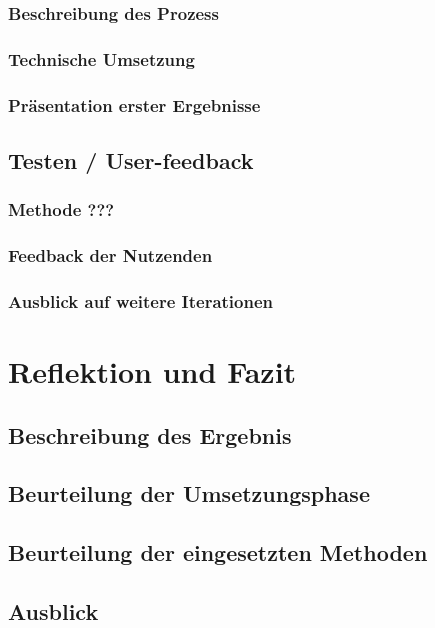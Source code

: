 \documentclass[12pt]{article}
\begin{document}
\subsubsection{Beschreibung des Prozess}
\subsubsection{Technische Umsetzung}
\subsubsection{Präsentation erster Ergebnisse}

\subsection{Testen / User-feedback}
\subsubsection{Methode ???}
\subsubsection{Feedback der Nutzenden}
\subsubsection{Ausblick auf weitere Iterationen}

\section{Reflektion und Fazit}
\subsection{Beschreibung des Ergebnis}
\subsection{Beurteilung der Umsetzungsphase}
\subsection{Beurteilung der eingesetzten Methoden}
\subsection{Ausblick}

\newpage



\end{document}
